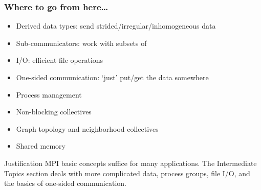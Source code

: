 \documentclass[10pt]{beamer}
\begin{document}

\renewcommand\standardversion{3}







\iffalse
\begin{exerciseframe}[serialsend]
  
\end{exerciseframe}
\fi

\begin{frame}[containsverbatim]\frametitle{Where to go from here\ldots}
  \begin{itemize}
  \item Derived data types: send strided/irregular/inhomogeneous data
  \item Sub-communicators: work with subsets of 
  \item I/O: efficient file operations
  \item One-sided communication: `just' put/get the data somewhere
  \item Process management
  \item Non-blocking collectives
  \item Graph topology and neighborhood collectives
  \item Shared memory
  \end{itemize}
\end{frame}

\renewcommand\standardversion{}


\begin{frame}{Justification}
  MPI basic concepts suffice for many applications.  The Intermediate
  Topics section deals with more complicated data, process groups,
  file I/O, and the basics of one-sided communication.
\end{frame}







 

\end{document}

